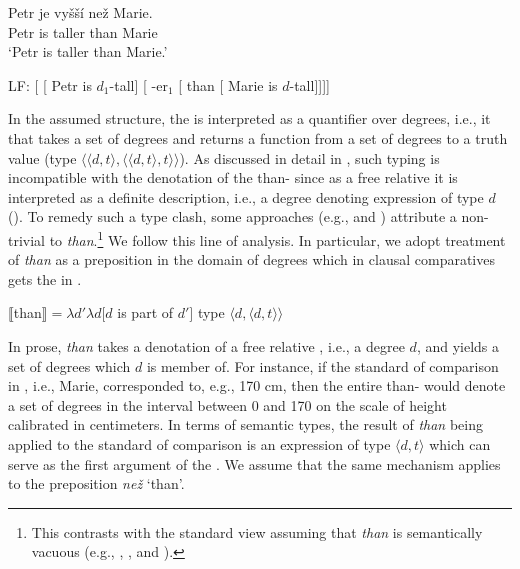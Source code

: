 \documentclass[output=paper,modfonts,hidelinks,newtxmath
\ChapterDOI{10.5281/zenodo.2545513}
]{langscibook}
\begin{document}
\ea \ea \gll Petr je vyšší než Marie.\label{comp}\\
Petr is taller than Marie\\
\glt `Petr is taller than Marie.'

\newpage
\ex LF: [ [ Petr is $d_1$-tall] [ -er$_1$ [ than [ Marie is $d$-tall]]]]\label{comp-LF}
\z \z

\noindent In the assumed structure, the  is interpreted as a quantifier over degrees, i.e., it that takes a set of degrees and returns a function from a set of degrees to a truth value (type $\langle \langle d,t\rangle,\langle \langle d,t\rangle,t\rangle\rangle$). As discussed in detail in \cite{pancheva2006phrasal}, such typing is incompatible with the denotation of the than- since as a free relative it is interpreted as a definite description, i.e., a degree denoting expression of type $d$ (\citealt{heim_degree_2000}). To remedy such a type clash, some approaches (e.g., \citealt{von_stechow_comparing_1984} and \citealt{rullmann1995maximality}) attribute a non-trivial  to \textit{than}.\footnote{This contrasts with the standard view assuming that \textit{than} is semantically vacuous (e.g., \citealt{heim_degree_2000}, \citealt{kennedy2001polar}, and \citealt{schwarzschild_wilkinson2002quantifiers}).} We follow this line of analysis. In particular, we adopt  treatment of \textit{than} as a  preposition in the domain of degrees which in clausal comparatives gets the  in .

\ea $\llbracket$than$\rrbracket = \lambda d'\lambda d[d$ is part of $d']$ \hfill{type $\langle d,\langle d,t\rangle\rangle$}\label{than-semantics}
\z

\noindent In prose, \textit{than} takes a denotation of a free relative , i.e., a degree $d$, and yields a set of degrees which $d$ is member of. For instance, if the standard of comparison in , i.e., Marie, corresponded to, e.g., 170 cm, then the entire than- would denote a set of degrees in the interval between 0 and 170 on the scale of height calibrated in centimeters. In terms of semantic types, the result of \textit{than} being applied to the standard of comparison is an expression of type $\langle d,t\rangle$ which can serve as the first argument of the . We assume that the same mechanism applies to the  preposition \textit{než} `than'.
\end{document}
